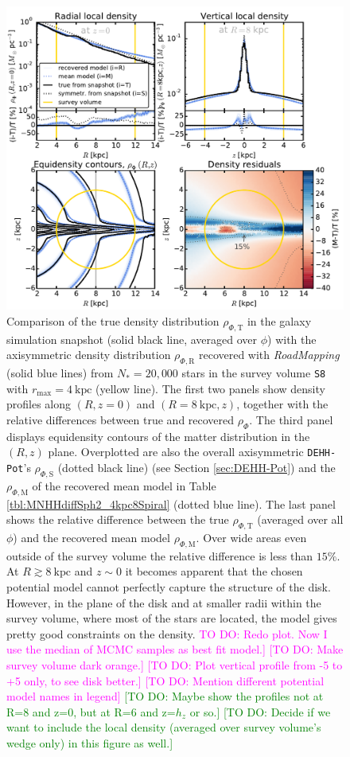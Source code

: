 \documentclass[iop,revtex4,numberedappendix,appendixfloats]{emulateapj}
\newcommand{\RM}{{\sl RoadMapping}}
\newcommand{\Wilma}[1]{\textcolor{Magenta}{#1}}
\newcommand{\HW}[1]{\textcolor{Green}{#1}}
\begin{document}
\begin{figure}[!htbp]
\centering
\includegraphics[width=\columnwidth]{fig/MNdHHdiffSph2_4kpc8Spiral_a_test1_density_overview.pdf}
\caption{Comparison of the true density distribution $\rho_{\Phi,\text{T}}$ in the galaxy simulation snapshot (solid black line, averaged over $\phi$) with the axisymmetric density distribution $\rho_{\Phi,\text{R}}$ recovered with \RM{} (solid blue lines) from $N_*=20,000$ stars in the survey volume \texttt{S8} with $r_\text{max}=4~\text{kpc}$ (yellow line). The first two panels show density profiles along $(R,z=0)$ and $(R=8~\text{kpc},z)$, together with the relative differences between true and recovered $\rho_{\Phi}$. The third panel displays equidensity contours of the matter distribution in the $(R,z)$ plane. Overplotted are also the overall axisymmetric \texttt{DEHH-Pot}'s $\rho_{\Phi,\text{S}}$ (dotted black line) (see Section \ref{sec:DEHH-Pot}) and the $\rho_{\Phi,\text{M}}$ of the recovered mean model in Table \ref{tbl:MNHHdiffSph2_4kpc8Spiral} (dotted blue line). The last panel shows the relative difference between the true $\rho_{\Phi,\text{T}}$ (averaged over all $\phi$) and the recovered mean model $\rho_{\Phi,\text{M}}$. Over wide areas even outside of the survey volume the relative difference is less than $15\%$. At $R\gtrsim8~\text{kpc}$ and $z\sim0$ it becomes apparent that the chosen potential model cannot perfectly capture the structure of the disk. However, in the plane of the disk and at smaller radii within the survey volume, where most of the stars are located, the model gives pretty good constraints on the density.  \Wilma{TO DO: Redo plot. Now I use the median of MCMC samples as best fit model.]} \Wilma{[TO DO: Make survey volume dark orange.]} \Wilma{[TO DO: Plot vertical profile from -5 to +5 only, to see disk better.]} \Wilma{[TO DO: Mention different potential model names in legend]} \HW{[TO DO: Maybe show the profiles not at R=8 and z=0, but at R=6 and z=$h_z$ or so.]} \HW{[TO DO: Decide if we want to include the local density (averaged over survey volume's wedge only) in this figure as well.]}}
\label{fig:4kpc8Spiral_density}
\end{figure}
\end{document}
